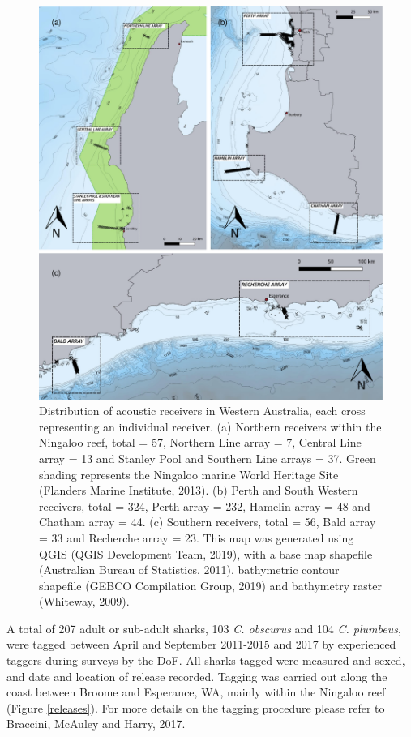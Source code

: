 \documentclass[11pt,a4paper]{article}
\begin{document}
	\begin{figure}
		\centering\includegraphics[width=\textwidth]{../Data/arrays_combined2.pdf}
		\caption{Distribution of acoustic receivers in Western Australia, each cross representing an individual receiver. (a) Northern receivers within the Ningaloo reef, total = 57, Northern Line array = 7, Central Line array = 13 and Stanley Pool and Southern Line arrays = 37. Green shading represents the Ningaloo marine World Heritage Site (Flanders Marine Institute, 2013). (b) Perth and South Western receivers, total = 324, Perth array = 232, Hamelin array = 48 and Chatham array = 44. (c) Southern receivers, total = 56, Bald array = 33 and Recherche array = 23. This map was generated using QGIS (QGIS Development Team, 2019), with a base map shapefile (Australian Bureau of Statistics, 2011), bathymetric contour shapefile (GEBCO Compilation Group, 2019) and bathymetry raster (Whiteway, 2009).}
		\label{arrays}
	\end{figure}
	
	A total of 207 adult or sub-adult sharks, 103 \textit{C. obscurus} and 104 \textit{C. plumbeus}, were tagged between April and September 2011-2015 and 2017 by experienced taggers during surveys by the DoF. All sharks tagged were measured and sexed, and date and location of release recorded. Tagging was carried out along the coast between Broome and Esperance, WA, mainly within the Ningaloo reef (Figure \ref{releases}). For more details on the tagging procedure please refer to Braccini, McAuley and Harry, 2017.\\
	\\ 
	
\end{document}

